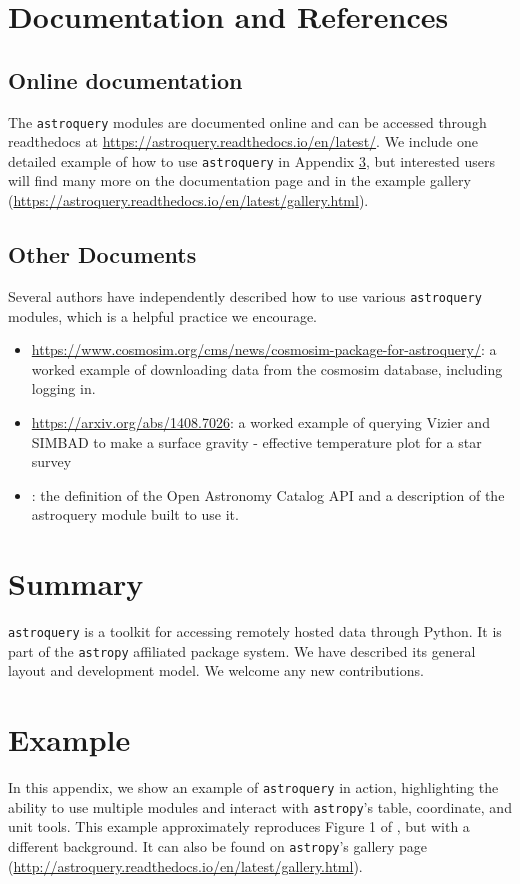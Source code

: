 \documentclass[twocolumn]{aastex61}
\newcommand{\package}[1]{\texttt{#1}\xspace}
\newcommand{\astroquery}{\package{astroquery}}
\newcommand{\astropypkg}{\package{astropy}}
\begin{document}
\section{Documentation and References}
\label{sec:documentation}
\subsection{Online documentation}
The \astroquery modules are documented online and can be accessed through
readthedocs at \url{https://astroquery.readthedocs.io/en/latest/}.
We include one detailed example of how to use \astroquery in Appendix \ref{sec:example},
but interested users will find many more on the documentation page and
in the example gallery (\url{https://astroquery.readthedocs.io/en/latest/gallery.html}).

\subsection{Other Documents}
Several authors have independently described how to use various \astroquery
modules, which is a helpful practice we encourage.

\begin{itemize}
    \item
        \url{https://www.cosmosim.org/cms/news/cosmosim-package-for-astroquery/}:
        a worked example of downloading data from the cosmosim database,
        including logging in.
    \item \url{https://arxiv.org/abs/1408.7026}: a worked example of querying
        Vizier and SIMBAD to make a surface gravity - effective temperature
        plot for a star survey
    \item \citep{Guillochon2018a}: the definition of
        the Open Astronomy Catalog API and a description of the astroquery
        module built to use it.
\end{itemize}

\section{Summary}
\astroquery is a toolkit for accessing remotely hosted data through Python.
It is part of the \astropypkg affiliated package system.
We have described its general layout and development model.
We welcome any new contributions.





\appendix
\section{Example}
\label{sec:example}
In this appendix, we show an example of \astroquery in action, highlighting the
ability to use multiple modules and interact with \astropypkg's table, coordinate,
and unit tools.  This example approximately reproduces Figure 1 of
\citet{Eisner2016a}, but with a different background.
It can also be found on \astropypkg's gallery page (\url{http://astroquery.readthedocs.io/en/latest/gallery.html}).
\end{document}
